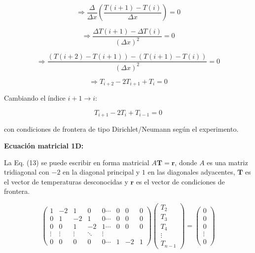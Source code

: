 \documentclass[11pt,a4paper]{article}
\begin{document}
\begin{equation}
\Rightarrow \frac{\Delta}{\Delta x} \left( \frac{T(i + 1) - T(i)}{\Delta x} \right) = 0
\end{equation}

\begin{equation}
\Rightarrow\frac{ \Delta T(i + 1) - \Delta T(i)}{ (\Delta x)^2} = 0
\end{equation}

\begin{equation}
\Rightarrow \frac{\left( T(i + 2) - T(i + 1) \right) - 
\left( T(i + 1) - T(i) \right)}{ (\Delta x)^2} = 0
\end{equation}

\begin{equation}
\Rightarrow T_{i+2} - 2 T_{i+1} + T_{i} = 0
\end{equation}

Cambiando el \'indice $i+1 \to i$:

\begin{equation}
T_{i+1} -2T_i + T_{i-1}=0
\end{equation}

con condiciones de frontera de tipo Dirichlet/Neumann seg\'un el experimento.

\textbf{Ecuaci\'on matricial 1D:}

La Eq. (13) se puede escribir en forma matricial $A \mathbf{T} = \mathbf{r}$,
donde $A$ es una matriz tridiagonal con $-2$ en la diagonal principal y $1$ 
en las diagonales adyacentes, $\mathbf{T}$ es el vector de temperaturas 
desconocidas y $\mathbf{r}$ es el vector de condiciones de frontera.

\begin{equation}
\begin{pmatrix}
1 & -2 & 1 & 0 & 0  \cdots & 0 & 0 & 0 \\
0 & 1 & -2 & 1 & 0  \cdots & 0 & 0 & 0 \\
0 & 0 & 1 & -2 & 1  \cdots & 0 & 0 & 0 \\
\vdots & \vdots & \vdots & \ddots & \vdots \\
0 & 0 & 0 & 0 & 0  \cdots & 1 & -2 & 1
\end{pmatrix}
\begin{pmatrix}
T_2 \\
T_3 \\
T_4 \\
\vdots \\
T_{n-1}
\end{pmatrix}
=
\begin{pmatrix}
0 \\
0 \\
0 \\
\vdots \\
0
\end{pmatrix}
\end{equation}
\end{document}
